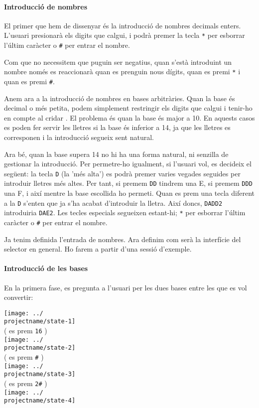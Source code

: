 \paragraph{Introducció de nombres} El primer que hem de dissenyar és la introducció de nombres decimals enters.
L'usuari presionarà els digits que calgui, i podrà premer la tecla \texttt{*}
per esborrar l'últim caràcter o \texttt{\#} per entrar el nombre.

Com que no necessitem que puguin ser negatius, quan s'està introduint un nombre
només es reaccionarà quan es prenguin nous dígits, quan es premi \texttt{*}
i quan es premi \texttt{\#}.

Anem ara a la introducció de nombres en bases arbitràries. Quan la base és
decimal o més petita, podem simplement restringir els digits que calgui i tenir-ho
en compte al cridar . El problema és quan la base és major a 10.
En aquests casos es poden fer servir les lletres si la base és inferior a 14,
ja que les lletres es corresponen i la introducció segueix sent natural.

Ara bé, quan la base supera 14 no hi ha una forma natural, ni senzilla de
gestionar la introducció. Per permetre-ho igualment, si l'usuari vol, es
decideix el següent: la tecla \texttt{D} (la 'més alta') es podrà premer
varies vegades seguides per introduir lletres més altes. Per tant, si premem
\texttt{DD} tindrem una E, si premem \texttt{DDD} una F, i així mentre
la base escollida ho permeti. Quan es prem una tecla diferent a la \texttt{D}
s'enten que ja s'ha acabat d'introduir la lletra. Així doncs, \texttt{DADD2}
introduiria \texttt{DAE2}. Les tecles especials segueixen estant-hi; \texttt{*}
per esborrar l'últim caràcter o \texttt{\#} per entrar el nombre.

Ja tenim definida l'entrada de nombres. Ara definim com serà la interfície del
selector en general. Ho farem a partir d'una sessió d'exemple.

\paragraph{Introducció de les bases} En la primera fase, es pregunta a l'usuari per les dues bases entre les
que es vol convertir:

\begin{center}
  \texttt{[image: ../\\projectname/state-1]} \\
  ( es prem \texttt{16} ) \\
  \texttt{[image: ../\\projectname/state-2]} \\
  ( es prem \texttt{\#} ) \\
  \texttt{[image: ../\\projectname/state-3]} \\
  ( es prem \texttt{2\#} ) \\
  \texttt{[image: ../\\projectname/state-4]}
\end{center}

